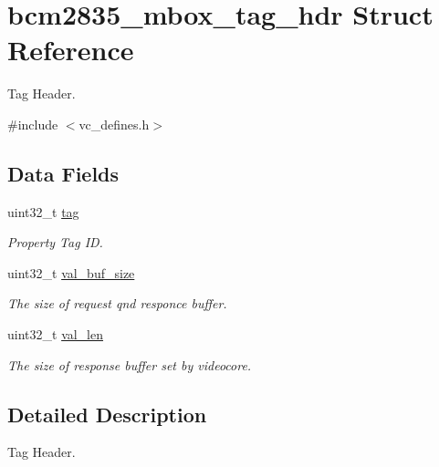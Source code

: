 \hypertarget{structbcm2835__mbox__tag__hdr}{}\section{bcm2835\+\_\+mbox\+\_\+tag\+\_\+hdr Struct Reference}
\label{structbcm2835__mbox__tag__hdr}


Tag Header.  




{\ttfamily \#include $<$vc\+\_\+defines.\+h$>$}

\subsection*{Data Fields}
\begin{DoxyCompactItemize}
\item 
\mbox{\label{structbcm2835__mbox__tag__hdr_a4ccd0410b2ae3b6f6ac5ede5f13833b2}} 
uint32\+\_\+t \mbox{\hyperlink{structbcm2835__mbox__tag__hdr_a4ccd0410b2ae3b6f6ac5ede5f13833b2}{tag}}
\begin{DoxyCompactList}\small\item\em Property Tag ID. \end{DoxyCompactList}\item 
\mbox{\label{structbcm2835__mbox__tag__hdr_a83fb47315b25d9dd69b27dbc4a384abd}} 
uint32\+\_\+t \mbox{\hyperlink{structbcm2835__mbox__tag__hdr_a83fb47315b25d9dd69b27dbc4a384abd}{val\+\_\+buf\+\_\+size}}
\begin{DoxyCompactList}\small\item\em The size of request qnd responce buffer. \end{DoxyCompactList}\item 
uint32\+\_\+t \mbox{\hyperlink{structbcm2835__mbox__tag__hdr_acedc82bb5b00c29f41aa762751f31ade}{val\+\_\+len}}
\begin{DoxyCompactList}\small\item\em The size of response buffer set by videocore. \end{DoxyCompactList}\end{DoxyCompactItemize}


\subsection{Detailed Description}
Tag Header. 

